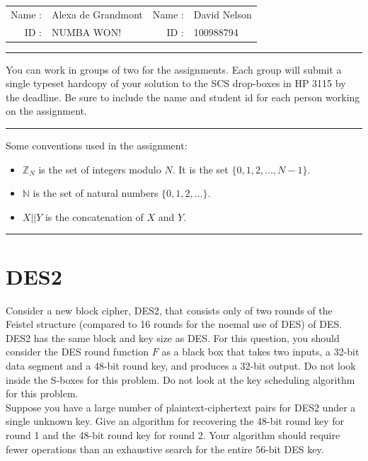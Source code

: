 \documentclass[12pt, letterpaper]{article}
\begin{document}
{\Large
\begin{tabular}{rm{6cm}rm{6cm}}
Name :  & {Alexa de Grandmont} & Name : & {David Nelson}           \\
ID :    & NUMBA WON!   & ID :   & 100988794
\end{tabular}
}

\bigskip
\hrule
\bigskip


You can work in groups of two for the assignments. Each group will submit a single
typeset hardcopy of your solution to the SCS drop-boxes in HP 3115 by the deadline. Be sure to include the name and student id for
each person working on the assignment.  

\bigskip
\hrule
\bigskip

Some conventions used in the assignment:
\begin{itemize}\itemsep0cm
\item $\mathbb{Z}_N$ is the set of integers modulo $N$. It is the set $\{0,1,2,\dots,N-1\}$. 
\item $\mathbb{N}$ is the set of natural numbers $\{0,1,2,\dots\}$.
\item $X || Y$ is the concatenation of $X$ and $Y$.
\end{itemize}

\hrule

\section{DES2}
Consider a new block cipher, DES2, that consists only of two rounds of the Feistel structure (compared to 16 rounds for the noemal use of DES) of DES.  
DES2 has the same block and key size as DES. 
For this question, you should consider the DES round function $F$ 
as a black box that takes two inputs, a 32-bit data segment and
a 48-bit round key, and produces a 32-bit  output. Do not look inside the S-boxes for this problem. Do not look at the key scheduling algorithm for this problem.\\

Suppose you have a large number of plaintext-ciphertext pairs for DES2 under a single unknown key. 
Give an algorithm for recovering the 48-bit round key for round 1 and the 48-bit round key for round 2.
Your algorithm should require fewer operations than an exhaustive search for the entire 56-bit DES key. \\
\end{document}

